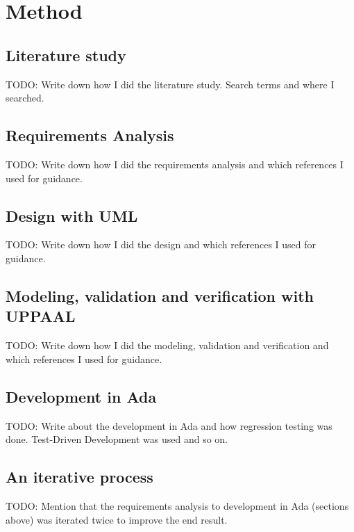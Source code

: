 \chapter{Method}\label{ch:method}
\section{Literature study}
TODO: Write down how I did the literature study. Search terms and where I
searched.

\section{Requirements Analysis}
TODO: Write down how I did the requirements analysis and which references I
used for guidance.

\section{Design with UML}
TODO: Write down how I did the design and which references I used for guidance.

\section{Modeling, validation and verification with UPPAAL}
TODO: Write down how I did the modeling, validation and verification and which
references I used for guidance.

\section{Development in Ada}
TODO: Write about the development in Ada and how regression testing was done.
Test-Driven Development was used and so on.

\section{An iterative process}
TODO: Mention that the requirements analysis to development in Ada (sections
above) was iterated twice to improve the end result.
